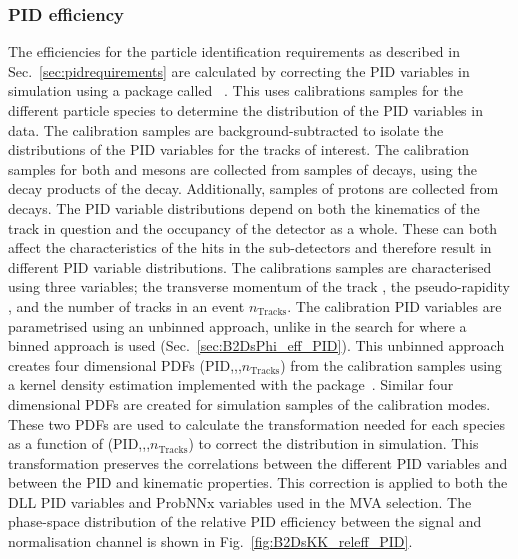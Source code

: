 \subsubsection{PID efficiency}
The efficiencies for the particle identification requirements as described in Sec.~\ref{sec:pidrequirements} are calculated by correcting the PID variables in simulation using a package called \pidcalib~\cite{PIDCalib}. This uses calibrations samples for the different particle species to determine the distribution of the PID variables in data. The calibration samples are background-subtracted to isolate the distributions of the PID variables for the tracks of interest. The calibration samples for both \Kp and \pip mesons are collected from samples of \decay{\Dstarp}{(\decay{\Dz}{\Kp\pim})\pip} decays, using the decay products of the \Dz decay. Additionally, samples of protons are collected from \decay{\PLambda}{\proton\pim} decays. The PID variable distributions depend on both the kinematics of the track in question and the occupancy of the detector as a whole. These can both affect the characteristics of the hits in the \rich sub-detectors and therefore result in different PID variable distributions. The calibrations samples are characterised using three variables; the transverse momentum of the track \pt, the pseudo-rapidity \Peta, and the number of tracks in an event $n_{\text{Tracks}}$. 
The calibration PID variables are parametrised using an unbinned approach, unlike in the search for \decay{\Bp}{\Dsp\phiz} where a binned approach is used (Sec.~\ref{sec:B2DsPhi_eff_PID}). This unbinned approach creates four dimensional PDFs (PID,\Peta,\pt,$n_{\text{Tracks}}$) from the calibration samples using a kernel density estimation implemented with the \meerkat package~\cite{Meerkat}. Similar four dimensional PDFs are created for simulation samples of the calibration modes. These two PDFs are used to calculate the transformation needed for each species as a function of (PID,\Peta,\pt,$n_{\text{Tracks}}$) to correct the distribution in simulation. 
This transformation preserves the correlations between the different PID variables and between the PID and kinematic properties. 
This correction is applied to both the DLL PID variables and ProbNNx variables used in the MVA selection. 
The phase-space distribution of the relative PID efficiency between the signal and normalisation channel is shown in Fig.~\ref{fig:B2DsKK_releff_PID}.

